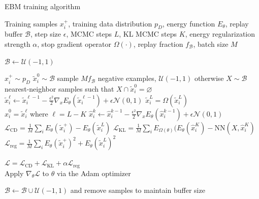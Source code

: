 \begin{algorithm}
\caption{EBM training algorithm}\label{alg:training}
\begin{algorithmic}
\Require Training samples $x_i^+$, training data distribution $\mathcal{}p_D$, energy function $E_\theta$, replay buffer $\mathcal{B}$, step size $\epsilon$, MCMC steps $L$, KL MCMC steps $K$, energy regularization strength $\alpha$, stop gradient operator $\Omega(\cdot)$, replay fraction $f_\mathcal{B}$, batch size $M$

	\State $\mathcal{B} \gets \mathcal{U}(-1,1)$ 

		\State $x_i^+ \sim \mathcal{}p_D$
		\State $\tilde{x}_{i}^0 \sim \mathcal{B}$ sample $M f_\mathcal{B}$ negative examples, $\mathcal{U}(-1,1)$ otherwise
		\State $X \sim \mathcal{B}$ nearest-neighbor samples such that $X \cap \tilde{x}_{i}^0 = \varnothing$
		\\
		  
			\State $\tilde{x}_{i}^\ell \gets \tilde{x}_{i}^{\ell-1} - \frac{\epsilon^2}{2}\nabla_x E_\theta(\tilde{x}_{i}^{\ell-1}) + \epsilon \mathcal{N}(0, 1)$
		\EndFor
		\State $\tilde{x}_{i}^{L} = \Omega(\tilde{x}_{i}^{L})$
		\\	
		\State $\hat{x}_{i}^0 = \tilde{x}_{i}^\ell$ where $\ell = L-K$ 
			\State $\hat{x}_{i}^k \gets \hat{x}_{i}^{k-1} - \frac{\epsilon^2}{2}\nabla_x E_\theta(\hat{x}_{i}^{k-1}) + \epsilon \mathcal{N}(0, 1)$ 
		\EndFor
		\\
		\State $\mathcal{L}_\text{CD} = \frac{1}{M} \sum_i E_\theta(\tilde{x}_{i}^+) - E_\theta(\tilde{x}_{i}^L)$ 
		\State $\mathcal{L}_\text{KL} = \frac{1}{M} \sum_i E_{\Omega(\theta)}(E_\theta(\hat{x}_{i}^K) - \text{NN}(X, \hat{x}_{i}^K)$ 
		\State $\mathcal{L}_\text{reg} = \frac{1}{M} \sum_i E_\theta(\tilde{x}_{i}^+)^2 + E_\theta(\tilde{x}_{i}^L)^2$
		
		\State $\mathcal{L} = \mathcal{L}_\text{CD} + \mathcal{L}_\text{KL} + \alpha \mathcal{L}_\text{reg}$
		\\		
		\State Apply $\nabla_\theta \mathcal{L}$ to $\theta$ via the Adam optimizer

		\State $\mathcal{B} \gets \mathcal{B} \cup \mathcal{U}(-1,1)$ and remove samples to maintain buffer size
	\EndWhile
	
\end{algorithmic}
\end{algorithm}

